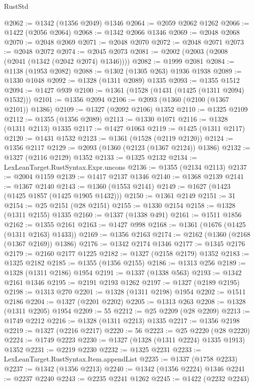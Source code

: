 \begin{lexlean}{RustStd}
\begin{coremodule}
@2062 := @1342 (@1356 @2049) @1346
@2064 := @2059 @2062 @1262
@2066 := @1422 (@2056 @2064)
@2068 := @1342 @2066 @1346
@2069 := @2048 @2068
@2070 := @2048 @2069
@2071 := @2048 @2070
@2072 := @2048 @2071
@2073 := @2048 @2072
@2074 := @2045 @2073
@2081 := @2002 (@2003 (@2008 (@2041 (@1342 (@2042 @2074) @1346))))
@2082 := @1999 @2081
@2084 := @1138 (@1953 @2082)
@2088 := @1302 (@1305 @263) @1936 @1938
@2089 := @1330 @1048
@2092 := @1328 (@1311 @2089) @1335
@2093 := @1355 @1512
@2094 := @1427 @939
@2100 := @1361 (@1528 (@1431 (@1425 (@1311 @2094) @1532)))
@2101 := @1356 @2094
@2106 := @2093 (@1360 (@2100 (@1367 @2101)) @1386)
@2109 := @1327 (@2092 @2106) @1352
@2110 := @1325 @2109
@2112 := @1355 (@1356 @2089)
@2113 := @1330 @1071
@2116 := @1328 (@1311 @2113) @1335
@2117 := @1427 @1063
@2119 := @1425 (@1311 @2117)
@2120 := @1431 @1532
@2123 := @1361 (@1528 (@2119 @2120))
@2124 := @1356 @2117
@2129 := @2093 (@1360 (@2123 (@1367 @2124)) @1386)
@2132 := @1327 (@2116 @2129) @1352
@2133 := @1325 @2132
@2134 := LexLeanTarget.RustSyntax.Expr.uncons
@2136 := @1355 (@2134 @2113)
@2137 := @2004 @1159
@2139 := @1417 @2137 @1346
@2140 := @1368 @2139
@2141 := @1367 @2140
@2143 := @1360 (@1553 @2141)
@2149 := @1627 (@1423 (@1425 @1857 (@1425 @1905 @1432)))
@2150 := @1361 @2149
@2151 := 31
@2154 := @25 @2151 (@28 @2151)
@2155 := @1330 @2154
@2158 := @1328 (@1311 @2155) @1335
@2160 := @1337 (@1338 @491)
@2161 := @1511 @1856
@2162 := @1355 @2161
@2163 := @1427 @998
@2168 := @1361 (@1676 (@1425 (@1311 @2163) @1433))
@2169 := @1356 @2163
@2174 := @2162 (@1360 (@2168 (@1367 @2169)) @1386)
@2176 := @1342 @2174 @1346
@2177 := @1345 @2176
@2179 := @2160 @2177 @1225
@2182 := @1327 (@2158 @2179) @1352
@2183 := @1325 @2182
@2185 := @1355 (@1356 @2155)
@2186 := @1313 @256
@2189 := @1328 (@1311 @2186) @1954
@2191 := @1337 (@1338 @563)
@2193 := @1342 @2161 @1346
@2195 := @2191 @2193 @1262
@2197 := @1327 (@2189 @2195)
@2198 := @1313 @270
@2201 := @1328 (@1311 @2198) @1954
@2202 := @1511 @2186
@2204 := @1327 (@2201 @2202)
@2205 := @1313 @263
@2208 := @1328 (@1311 @2205) @1954
@2209 := 55
@2212 := @25 @2209 (@28 @2209)
@2213 := @1749 @2212
@2216 := @1328 (@1311 @2213) @1335
@2217 := @1356 @2198
@2219 := @1327 (@2216 @2217)
@2220 := 56
@2223 := @25 @2220 (@28 @2220)
@2224 := @1749 @2223
@2230 := @1327 (@1328 (@1311 @2224) @1335 @1913) @1352
@2231 := @2219 @2230
@2232 := @1325 @2231
@2233 := LexLeanTarget.RustSyntax.Item.appendList
@2235 := @1337 (@1758 @2233)
@2237 := @1342 (@1356 @2213)
@2240 := @1342 (@1356 @2224) @1346
@2241 := @2237 @2240
@2243 := @2235 @2241 @1262
@2245 := @1422 (@2232 @2243)

\end{coremodule}
\end{lexlean}
